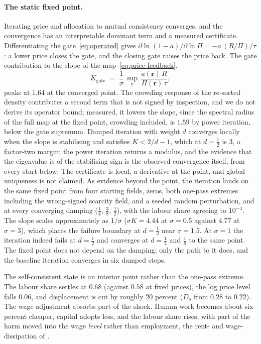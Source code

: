 \documentclass[12pt, a4paper]{article}
\newcommand{\rr}{\mathbf{r}}
\begin{document}
\paragraph{The static fixed point.}
Iterating price and allocation to mutual consistency converges, and the
convergence has an interpretable dominant term and a measured
certificate. Differentiating the gate~\eqref{eq:operated} gives
$\partial \ln(1-a)/\partial \ln\Pi = -a\,(R/\Pi)/\tau$: a lower price
closes the gate, and the closing gate raises the price back. The gate
contribution to the slope of the map~\eqref{eq:price-feedback},
\begin{equation}
K_{\text{gate}} \;=\; \frac{1}{\sigma}\,\sup_{\rr}\,
\frac{a(\rr)\,R}{\Pi(\rr)\,\tau},
\label{eq:contraction}
\end{equation}
peaks at $1.64$ at the converged point. The crowding response of the
re-sorted density contributes a second term that is not signed by
inspection, and we do not derive its operator bound; measured, it
lowers the slope, since the spectral radius of the full map at the
fixed point, crowding included, is $1.59$ by power iteration, below the
gate supremum. Damped iteration with weight $d$ converges locally when
the slope is stabilising and satisfies $K < 2/d - 1$, which at
$d = \tfrac12$ is $3$, a factor-two margin; the power iteration
returns a modulus, and the evidence that the eigenvalue is of the
stabilising sign is the observed convergence itself, from every start
below. The certificate is local, a
derivative at the point, and global uniqueness is not claimed. As
evidence beyond the point, the iteration lands on the same fixed point
from four starting fields, zeros, both one-pass extremes including the
wrong-signed scarcity field, and a seeded random perturbation, and at
every converging damping ($\tfrac14$, $\tfrac38$, $\tfrac12$), with the
labour share agreeing to $10^{-4}$. The slope
scales approximately as $1/\sigma$ ($\sigma K = 4.44$ at $\sigma = 0.5$
against $4.77$ at $\sigma = 3$), which places the failure boundary at
$d = \tfrac12$ near $\sigma = 1.5$. At $\sigma = 1$ the iteration
indeed fails at $d = \tfrac12$ and converges at $d = \tfrac14$ and
$\tfrac18$ to the same point. The fixed point does not depend on the
damping; only the path to it does, and the baseline iteration converges
in six damped steps.

The self-consistent state is an interior point rather than the
one-pass extreme. The labour share settles at $0.68$ (against $0.58$ at
fixed prices), the log price level falls $0.06$, and displacement is
cut by roughly $20$ percent ($D_o$ from $0.28$ to $0.22$). The wage
adjustment absorbs part of the shock. Human work becomes about six
percent cheaper, capital adopts less, and the labour share rises, with
part of the harm moved into the wage \emph{level} rather than
employment, the rent- and wage-dissipation of
\textcite{acemoglu2024rents}.
\end{document}
